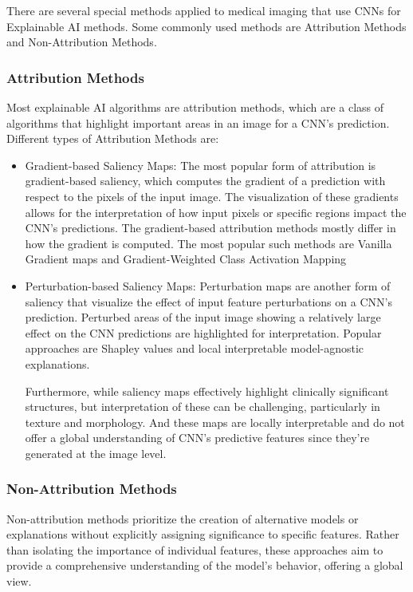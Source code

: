 \noindent
There are several special methods applied to medical imaging that use CNNs for Explainable AI methods. Some commonly used methods are Attribution Methods and Non-Attribution Methods.

\subsubsection{Attribution Methods}

\noindent
Most explainable AI algorithms are attribution methods, which are a class of algorithms that highlight important areas in an image for a CNN’s prediction. Different types of Attribution Methods are:

\begin{itemize}
    \item Gradient-based Saliency Maps: The most popular form of attribution is gradient-based saliency, which computes the gradient of a prediction with respect to the pixels of the input image\cite{FIGAN}. The visualization of these gradients allows for the interpretation of how input pixels or specific regions impact the CNN's predictions. The gradient-based attribution methods mostly differ in how the gradient is computed. The most popular such methods are Vanilla Gradient maps and Gradient-Weighted Class Activation Mapping

    \item Perturbation-based Saliency Maps: Perturbation maps are another form of saliency that visualize the effect of input feature perturbations on a CNN’s prediction. Perturbed areas of the input image showing a relatively large effect on the CNN predictions are highlighted for interpretation\cite{FIGAN}. Popular approaches are Shapley values and local interpretable model-agnostic explanations.

    \noindent
    Furthermore, while saliency maps effectively highlight clinically significant structures, but interpretation of these can be challenging, particularly in texture and morphology. And these maps are locally interpretable and do not offer a global understanding of CNN's predictive features since they're generated at the image level.
\end{itemize}

\subsubsection{Non-Attribution Methods}

\noindent
Non-attribution methods prioritize the creation of alternative models or explanations without explicitly assigning significance to specific features. Rather than isolating the importance of individual features, these approaches aim to provide a comprehensive understanding of the model's behavior, offering a global view.

